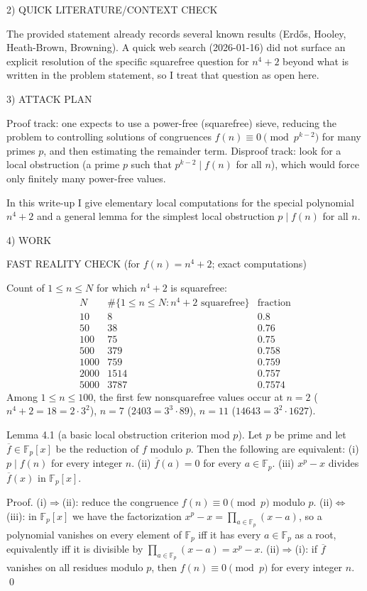 2) QUICK LITERATURE/CONTEXT CHECK

The provided statement already records several known results (Erd\H{o}s, Hooley, Heath-Brown, Browning).
A quick web search (2026-01-16) did not surface an explicit resolution of the specific squarefree question for $n^4+2$ beyond what is written in the problem statement, so I treat that question as open here.

3) ATTACK PLAN

Proof track: one expects to use a power-free (squarefree) sieve, reducing the problem to controlling solutions of congruences $f(n)\equiv 0\pmod{p^{k-2}}$ for many primes $p$, and then estimating the remainder term.
Disproof track: look for a local obstruction (a prime $p$ such that $p^{k-2}\mid f(n)$ for all $n$), which would force only finitely many power-free values.

In this write-up I give elementary local computations for the special polynomial $n^4+2$ and a general lemma for the simplest local obstruction $p\mid f(n)$ for all $n$.

4) WORK

FAST REALITY CHECK (for $f(n)=n^4+2$; exact computations)

Count of $1\le n\le N$ for which $n^4+2$ is squarefree:
\[
\begin{array}{c|c|c}
N & \#\{1\le n\le N: n^4+2\text{ squarefree}\} & \text{fraction}\\\hline
10 & 8 & 0.8\\
50 & 38 & 0.76\\
100 & 75 & 0.75\\
500 & 379 & 0.758\\
1000 & 759 & 0.759\\
2000 & 1514 & 0.757\\
5000 & 3787 & 0.7574
\end{array}
\]
Among $1\le n\le 100$, the first few nonsquarefree values occur at
$n=2$ ($n^4+2=18=2\cdot 3^2$), $n=7$ ($2403=3^3\cdot 89$), $n=11$ ($14643=3^2\cdot 1627$).

Lemma 4.1 (a basic local obstruction criterion mod $p$).
Let $p$ be prime and let $\overline f\in\mathbb F_p[x]$ be the reduction of $f$ modulo $p$.
Then the following are equivalent:
(i) $p\mid f(n)$ for every integer $n$.
(ii) $\overline f(a)=0$ for every $a\in\mathbb F_p$.
(iii) $x^p-x$ divides $\overline f(x)$ in $\mathbb F_p[x]$.

Proof.
(i)$\Rightarrow$(ii): reduce the congruence $f(n)\equiv 0\pmod p$ modulo $p$.
(ii)$\Leftrightarrow$(iii): in $\mathbb F_p[x]$ we have the factorization
$x^p-x=\prod_{a\in\mathbb F_p}(x-a)$, so a polynomial vanishes on every element of $\mathbb F_p$ iff it has every $a\in\mathbb F_p$ as a root, equivalently iff it is divisible by $\prod_{a\in\mathbb F_p}(x-a)=x^p-x$.
(ii)$\Rightarrow$(i): if $\overline f$ vanishes on all residues modulo $p$, then $f(n)\equiv 0\pmod p$ for every integer $n$. \qed

